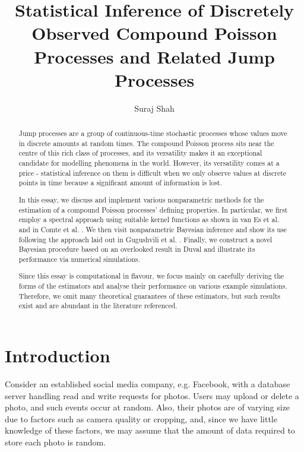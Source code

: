 \documentclass[a4paper,11pt]{article}
\title{Statistical Inference of Discretely Observed Compound Poisson Processes and Related Jump Processes}
\author{Suraj Shah}
\theoremstyle{theorem}
\theoremstyle{definition}
\theoremstyle{remark}
\begin{document}
\maketitle

\begin{abstract}
Jump processes are a group of continuous-time stochastic processes whose values move in discrete amounts at random times. The compound Poisson process sits near the centre of this rich class of processes, and its versatility makes it an exceptional candidate for modelling phenomena in the world. However, its versatility comes at a price - statistical inference on them is difficult when we only observe values at discrete points in time because a significant amount of information is lost. 

In this essay, we discuss and implement various nonparametric methods for the estimation of a compound Poisson processes' defining properties. In particular, we first employ a spectral approach using suitable kernel functions as shown in van Es et al. \citep{vanes2007} and in Comte et al. \citep{comte2014}. We then visit nonparametric Bayesian inference and show its use following the approach laid out in Gugushvili et al. \citep{gugushvili2018}. Finally, we construct a novel Bayesian procedure based on an overlooked result in Duval \citep{duval2013} and illustrate its performance via numerical simulations.

Since this essay is computational in flavour, we focus mainly on carefully deriving the forms of the estimators and analyse their performance on various example simulations. Therefore, we omit many theoretical guarantees of these estimators, but such results exist and are abundant in the literature referenced. 
\end{abstract}

\pagebreak

\tableofcontents

\pagebreak

\section{Introduction}

Consider an established social media company, e.g. Facebook, with a database server handling read and write requests for photos. Users may upload or delete a photo, and such events occur at random. Also, their photos are of varying size due to factors such as camera quality or cropping, and, since we have little knowledge of these factors, we may assume that the amount of data required to store each photo is random. 
\end{document}
